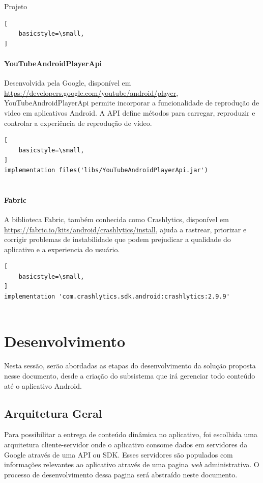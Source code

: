 \documentclass[
	12pt,				%
	openright,			%
	twoside,			%
	a4paper,			%
	english,			%
	french,				%
	spanish,			%
	brazil				%
	]{abntex2}
\begin{document}
\begin{chapter}{Projeto}
\begin{lstlisting}[
    basicstyle=\small,
]
\end{lstlisting}
   \paragraph{YouTubeAndroidPlayerApi}
   Desenvolvida pela Google, disponível em \url{https://developers.google.com/youtube/android/player}, YouTubeAndroidPlayerApi permite incorporar a funcionalidade de reprodução de video em aplicativos Android. A API  define métodos para carregar, reproduzir 
e controlar a experiência de reprodução de vídeo.
      \begin{lstlisting}[
    basicstyle=\small,
]
implementation files('libs/YouTubeAndroidPlayerApi.jar')
   
\end{lstlisting}
   \paragraph{Fabric}
   A biblioteca Fabric, também conhecida como Crashlytics, disponível em \url{https://fabric.io/kits/android/crashlytics/install}, ajuda a rastrear, priorizar e corrigir problemas de instabilidade que podem prejudicar a qualidade do aplicativo e a experiencia do usuário.
   \begin{lstlisting}[
    basicstyle=\small,
]
implementation 'com.crashlytics.sdk.android:crashlytics:2.9.9'
   
\end{lstlisting}

\newpage

\section{Desenvolvimento}
Nesta sessão, serão abordadas as etapas do desenvolvimento da solução proposta nesse documento, desde a criação do subsistema que irá gerenciar todo conteúdo até o aplicativo Android. 

\subsection{Arquitetura Geral}
Para possibilitar a entrega de conteúdo dinâmica no aplicativo, foi escolhida uma arquitetura cliente-servidor onde o aplicativo consome dados em servidores da Google através de uma API ou SDK. Esses servidores são populados com informações relevantes ao aplicativo através de uma pagina \textit{web} administrativa. O processo de desenvolvimento dessa pagina será abstraído neste documento.\\



\end{chapter}
\end{document}
